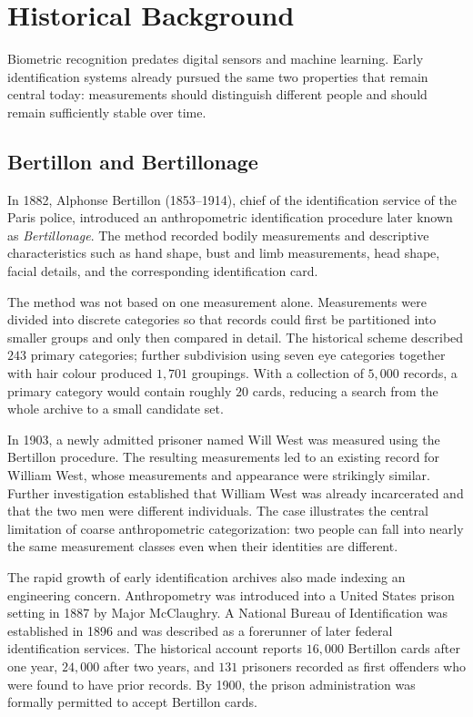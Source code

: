 \documentclass[11pt,a4paper,oneside]{report}
\begin{document}
\section{Historical Background}
\label{subsec:history}

Biometric recognition predates digital sensors and machine learning. Early
identification systems already pursued the same two properties that remain
central today: measurements should distinguish different people and should
remain sufficiently stable over time.

\subsection{Bertillon and Bertillonage}

In 1882, Alphonse Bertillon (1853--1914), chief of the identification
service of the Paris police, introduced an anthropometric identification
procedure later known as \emph{Bertillonage}. The method recorded bodily
measurements and descriptive characteristics such as hand shape, bust and
limb measurements, head shape, facial details, and the corresponding
identification card.

The method was not based on one measurement alone. Measurements were divided
into discrete categories so that records could first be partitioned into
smaller groups and only then compared in detail. The historical scheme
described \(243\) primary categories; further subdivision using seven eye
categories together with hair colour produced \(1{,}701\) groupings. With a
collection of \(5{,}000\) records, a primary category would contain roughly
\(20\) cards, reducing a search from the whole archive to a small candidate set.

\begin{examplebox}
In 1903, a newly admitted prisoner named Will West was measured using the
Bertillon procedure. The resulting measurements led to an existing record
for William West, whose measurements and appearance were strikingly similar.
Further investigation established that William West was already incarcerated
and that the two men were different individuals. The case illustrates the
central limitation of coarse anthropometric categorization: two people can
fall into nearly the same measurement classes even when their identities are
different.
\end{examplebox}

The rapid growth of early identification archives also made indexing an
engineering concern. Anthropometry was introduced into a United States prison
setting in 1887 by Major McClaughry. A National Bureau of Identification was
established in 1896 and was described as a forerunner of later federal
identification services. The historical account reports \(16{,}000\) Bertillon
cards after one year, \(24{,}000\) after two years, and \(131\) prisoners recorded
as first offenders who were found to have prior records. By 1900, the prison
administration was formally permitted to accept Bertillon cards.
\end{document}
